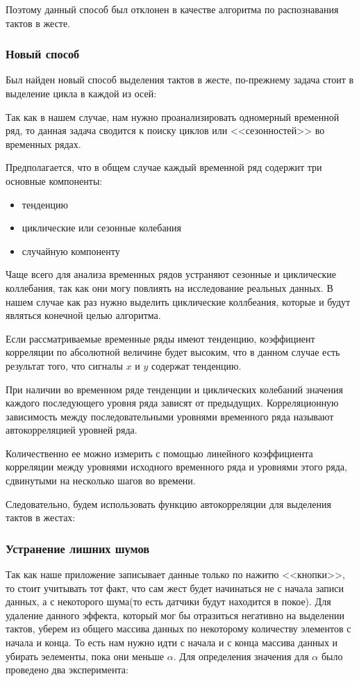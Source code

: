 Поэтому данный способ был отклонен в качестве алгоритма по распознавания тактов в жесте.

\subsubsection{Новый способ}
Был найден новый способ выделения тактов в жесте, по-прежнему задача стоит в выделение цикла в каждой из осей:

Так как в нашем случае, нам нужно проанализировать одномерный временной ряд, то данная задача сводится к поиску циклов или <<сезонностей>> во временных рядах.

Предполагается, что в общем случае каждый временной ряд содержит три основные компоненты:
\begin{itemize}
    \item тенденцию
    \item циклические или сезонные колебания
    \item случайную компоненту
\end{itemize}
Чаще всего для анализа временных рядов устраняют сезонные и циклические коллебания, так как они могу повлиять на исследование реальных данных. В нашем случае как раз нужно выделить циклические коллбеания, которые и будут являться конечной целью алгоритма.

Если рассматриваемые временные ряды имеют тенденцию, коэффициент корреляции по абсолютной величине будет высоким, что в данном случае есть результат того, что сигналы $x$ и $y$ содержат тенденцию.

При наличии во временном ряде тенденции и циклических колебаний значения каждого последующего уровня ряда зависят от предыдущих. Корреляционную зависимость между последовательными уровнями временного ряда называют автокорреляцией уровней ряда.

Количественно ее можно измерить с помощью линейного коэффициента корреляции между уровнями исходного временного ряда и уровнями этого ряда, сдвинутыми на несколько шагов во времени.

Следовательно, будем использовать функцию автокорреляции для выделения тактов в жестах:

\subsubsection{Устранение лишних шумов}
Так как наше приложение записывает данные только по нажитю <<кнопки>>, то стоит учитывать тот факт, что сам жест будет начинаться не с начала записи данных, а с некоторого шума(то есть датчики будут находится в покое). Для удаление данного эффекта, который мог бы отразиться негативно на выделении тактов, уберем из общего массива данных по некоторому количеству элементов с начала и конца. То есть нам нужно идти с начала и с конца массива данных и убирать эелементы, пока они меньше $\alpha$. Для определения значения для $\alpha$ было проведено два эксперимента:

